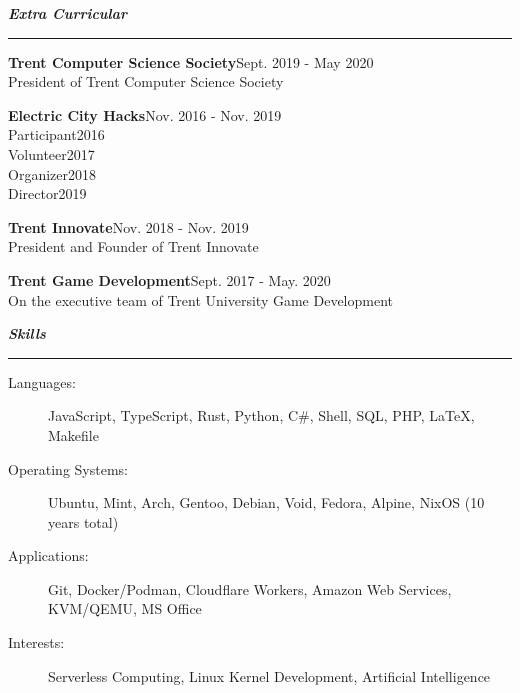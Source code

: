 \documentclass[letterpaper,11pt]{article}
\newcommand{\mysection}[1]{\vspace{5pt} {\bfseries \textsl{#1}} \\ {\color{gray} \rule[5pt]{\textwidth}{1pt}}}
\begin{document}
\mysection{Extra Curricular}
\begin{description}
    \item \textbf{Trent Computer Science Society}\hfill Sept. 2019 - May 2020\\
        President of Trent Computer Science Society
    \item \textbf{Electric City Hacks}\hfill Nov. 2016 - Nov. 2019\\
        Participant\hfill 2016\\
        Volunteer\hfill 2017\\
        Organizer\hfill 2018\\
        Director\hfill 2019
    \item \textbf{Trent Innovate}\hfill Nov. 2018 - Nov. 2019\\
        President and Founder of Trent Innovate
    \item \textbf{Trent Game Development}\hfill Sept. 2017 - May. 2020\\
        On the executive team of Trent University Game Development
\end{description}

\mysection{Skills}
\begin{description}
    \item[Languages:]
        JavaScript, TypeScript, Rust, Python, C\#, Shell, SQL, PHP, \LaTeX{}, Makefile
    \item[Operating Systems:]
        Ubuntu, Mint, Arch, Gentoo, Debian, Void, Fedora, Alpine, NixOS (10 years total)
    \item[Applications:]
        Git, Docker/Podman, Cloudflare Workers, Amazon Web Services, KVM/QEMU, MS Office
    \item[Interests:]
        Serverless Computing, Linux Kernel Development, Artificial Intelligence
\end{description}
\end{document}
